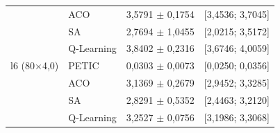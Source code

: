 \begin{table}[htb]
\begin{tabular}{llcc}
         & ACO & 3,5791 $\pm$ 0,1754 & [3,4536; 3,7045] \\
         & SA & 2,7694 $\pm$ 1,0455 & [2,0215; 3,5172] \\
         & Q-Learning & 3,8402 $\pm$ 0,2316 & [3,6746; 4,0059] \\
        \hline
        l6 (80$\times$4,0) & PETIC & 0,0303 $\pm$ 0,0073 & [0,0250; 0,0356] \\
         & ACO & 3,1369 $\pm$ 0,2679 & [2,9452; 3,3285] \\
         & SA & 2,8291 $\pm$ 0,5352 & [2,4463; 3,2120] \\
         & Q-Learning & 3,2527 $\pm$ 0,0756 & [3,1986; 3,3068] \\
        \hline
    \end{tabular}
\end{table}
